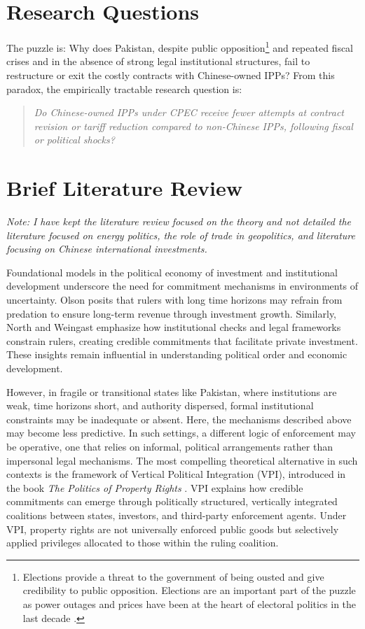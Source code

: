 \documentclass[12pt]{article}
\begin{document}
\section{Research Questions}
The puzzle is: Why does Pakistan, despite public opposition\footnote{Elections provide a threat to the government of being ousted and give credibility to public opposition. Elections are an important part of the puzzle as power outages and prices have been at the heart of electoral politics in the last decade \citep{Ravi2023}.} and repeated fiscal crises and in the absence of strong legal institutional structures, fail to restructure or exit the costly contracts with Chinese-owned IPPs? From this paradox, the empirically tractable research question is:

\begin{quote}
\textit{Do Chinese-owned IPPs under CPEC receive fewer attempts at contract revision or tariff reduction compared to non-Chinese IPPs, following fiscal or political shocks?}
\end{quote}

\section{Brief Literature Review}
\textit{Note: I have kept the literature review focused on the theory and not detailed the literature focused on energy politics, the role of trade in geopolitics, and literature focusing on Chinese international investments.}

Foundational models in the political economy of investment and institutional development underscore the need for commitment mechanisms in environments of uncertainty. Olson \citeyearpar{Olson1993} posits that rulers with long time horizons may refrain from predation to ensure long-term revenue through investment growth. Similarly, North and Weingast \citeyearpar{NorthWeingast1989} emphasize how institutional checks and legal frameworks constrain rulers, creating credible commitments that facilitate private investment. These insights remain influential in understanding political order and economic development.

However, in fragile or transitional states like Pakistan, where institutions are weak, time horizons short, and authority dispersed, formal institutional constraints may be inadequate or absent. Here, the mechanisms described above may become less predictive. In such settings, a different logic of enforcement may be operative, one that relies on informal, political arrangements rather than impersonal legal mechanisms. The most compelling theoretical alternative in such contexts is the framework of Vertical Political Integration (VPI), introduced in the book \textit{The Politics of Property Rights} \citep{Haber2003}. VPI explains how credible commitments can emerge through politically structured, vertically integrated coalitions between states, investors, and third-party enforcement agents. Under VPI, property rights are not universally enforced public goods but selectively applied privileges allocated to those within the ruling coalition.
\end{document}
